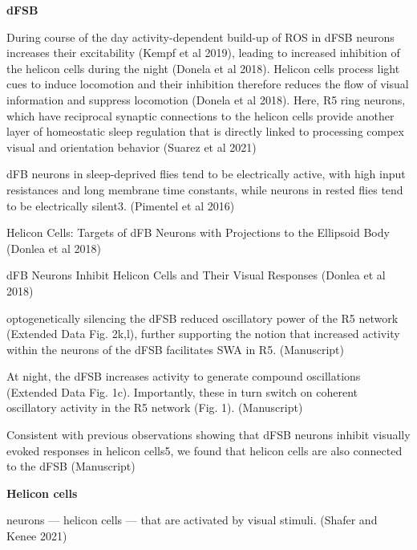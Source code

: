 \color{red}

\textbf{dFSB}

During course of the day activity-dependent build-up of ROS in dFSB neurons increases their excitability (Kempf et al 2019),
leading to increased inhibition of the helicon cells during the night (Donela et al 2018). Helicon cells process
light cues to induce locomotion and their inhibition therefore reduces the flow of visual information and
suppress locomotion (Donela et al 2018). Here, R5 ring neurons, which have reciprocal synaptic connections to the
helicon cells provide another layer of homeostatic sleep regulation that is directly linked to processing
compex visual and orientation behavior \cite{suarez-grimaltNeuralArchitectureSleep2021}
(Suarez et al 2021)

dFB neurons in sleep-deprived flies tend to be electrically active, with high input resistances and long membrane time constants, while neurons in rested flies tend to be  electrically silent3.
\cite{pimentelOperationHomeostaticSleep2016} (Pimentel et al 2016)

Helicon Cells: Targets of dFB Neurons with Projections to the Ellipsoid Body
\cite{donleaRecurrentCircuitryBalancing2018} (Donlea et al 2018)

dFB Neurons Inhibit Helicon Cells and Their Visual Responses
\cite{donleaRecurrentCircuitryBalancing2018} (Donlea et al 2018)

optogenetically silencing the dFSB reduced oscillatory
power of the R5 network (Extended Data Fig. 2k,l), further supporting the notion that
increased activity within the neurons of the dFSB facilitates SWA in R5. 
\cite{raccugliaCoherentMultilevelNetwork2022} (Manuscript)

At night, the dFSB increases activity to generate compound
oscillations (Extended Data Fig. 1c). Importantly, these in turn switch on coherent oscillatory
activity in the R5 network (Fig. 1).
\cite{raccugliaCoherentMultilevelNetwork2022} (Manuscript)

Consistent with previous
observations showing that dFSB neurons inhibit visually evoked responses in helicon cells5, we
found that helicon cells are also connected to the dFSB
\cite{raccugliaCoherentMultilevelNetwork2022} (Manuscript)


\noindent\hrulefill

\textbf{Helicon cells}

neurons — helicon cells — that are activated by visual stimuli.
\cite{shaferRegulationDrosophilaSleep2021} (Shafer and Kenee 2021)

